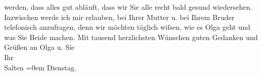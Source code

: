 \begin{ledgroupsized}[t]{13cm}
               werden, dass alles gut abläuft, dass wir Sie alle recht bald gesund wiedersehen.
               Inzwischen werde ich mir erlauben, bei Ihrer Mutter u. bei Ihrem Bruder telefonisch anzufragen, denn wir möchten täglich
               wiſsen, wie es Olga geht und was Sie Beide
               machen. \pend
           \pstart
           Mit tausend herzlichsten Wünschen guten Gedanken und Grüßen an Olga u. Sie {\\[\baselineskip]}Ihr {\\[\baselineskip]}\spacefill\mbox{Salten}\pend
           \leftskip=0em{}\pstart
           Dienstag.\pend
           
         
         \endnumbering{}\end{ledgroupsized}\begin{anhang}\end{anhang}\newcommand{\dateiname}{L03494}\newcommand{\titel}{Felix Salten an Arthur Schnitzler, [10. 12. 1907]}\newcommand{\editorInnen}{Martin Anton Müller und Laura Untner}
      